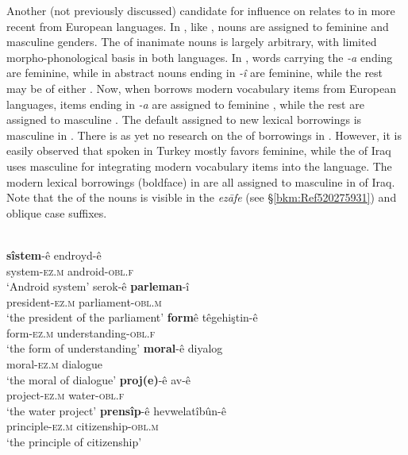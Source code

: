 \documentclass[output=paper]{langsci/langscibook}
\begin{document}
Another (not previously discussed) candidate for  influence on   relates to  in more recent  from European languages. In , like , nouns are assigned to feminine and masculine genders. The  of inanimate nouns is largely arbitrary, with limited morpho-phonological basis in both languages. In , words carrying the \textit{{}-a} ending are feminine, while in  abstract nouns ending in \textit{-î} are feminine, while the rest may be of either . Now, when  borrows modern vocabulary items from European languages, items ending in \textit{{}-a} are assigned to feminine , while the rest are assigned to masculine  \citep[5]{Ibrahim2015}. The default  assigned to new lexical borrowings is masculine in . There is as yet no research on the  of borrowings in . However, it is easily observed that  spoken in Turkey mostly favors feminine, while the  of Iraq uses masculine  for integrating modern vocabulary items into the language. The modern lexical borrowings (boldface) in  are all assigned to masculine  in   of Iraq. Note that the  of the nouns is visible in the \textit{ezāfe} (see §\ref{bkm:Ref520275931}) and oblique case suffixes. 

{}\label{bkm:Ref14712415}\\
\ea 
\gll \textbf{sîstem}-ê endroyd-ê\\
     system-\textsc{ez.m} android-\textsc{obl.f}\\
\glt ‘Android system’
\ex\label{parl}
\gll serok-ê \textbf{parleman}-î\\
     president-\textsc{ez.m} parliament-\textsc{obl.m}\\
\glt ‘the president of the parliament’
\ex \gll \textbf{form}ê têgehiştin-ê\\
     form-\textsc{ez.m} understanding\textsc{{}-obl.f}\\
\glt ‘the form of understanding’
\ex \gll \textbf{moral}-ê diyalog\\
     moral-\textsc{ez.m} dialogue\\
\glt ‘the moral of dialogue’
\ex \gll \textbf{proj(e)}-ê av-ê\\
     project-\textsc{ez.m} water-\textsc{obl.f}\\
\glt ‘the water project’
\ex
\gll \textbf{prensîp}-ê hevwelatîbûn-ê\\
     principle-\textsc{ez.m} citizenship-\textsc{obl.m}\\
\glt ‘the principle of citizenship’
\z
\z
\end{document}
